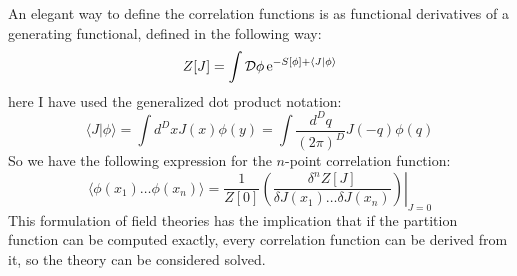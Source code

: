 An elegant way to define the correlation functions is as functional derivatives of a generating functional, defined in the following way:
\begin{equation}
 Z[J]  = \int \mathcal{D} \phi \operatorname{e}^{-S[\phi] + \langle J|\phi\rangle}
\end{equation}
here I have used the generalized dot product notation:
$$\langle J|\phi \rangle = \int d^D x J(x) \phi(y) = \int \frac{d^Dq}{(2\pi)^D} J(-q) \phi(q)$$
So we have the following expression for the $n$-point correlation function:
\begin{equation}
 \langle\phi(x_1)\dots \phi(x_n)\rangle = \frac{1}{Z[0]} \left.\left(\frac{\delta^nZ[J]}{\delta J(x_1)\dots \delta J(x_n)}\right)\right|_{J = 0}
\end{equation}
This formulation of field theories has the implication that if the partition function can be computed exactly, every correlation function can be derived from it, so the theory can be considered solved.

